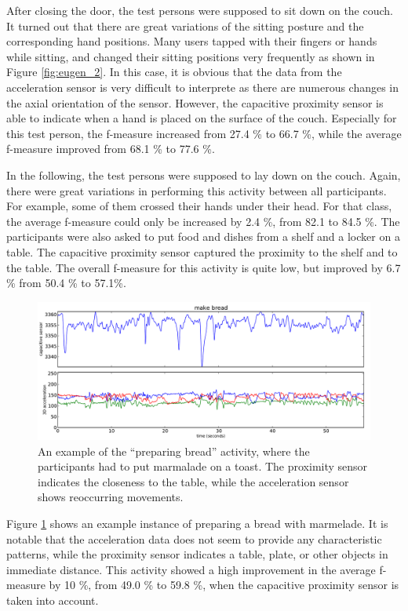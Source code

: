 \documentclass[runningheads,a4paper]{llncs}
\begin{document}
After closing the door, the test persons were supposed to sit down on the couch. It turned out that there are great variations of the sitting posture and the corresponding hand positions. Many users tapped with their fingers or hands while sitting, and changed their sitting positions very frequently as shown in Figure \ref{fig:eugen_2}. In this case, it is obvious that the data from the acceleration sensor is very difficult to interprete as there are numerous changes in the axial orientation of the sensor. However, the capacitive proximity sensor is able to indicate when a hand is placed on the surface of the couch. Especially for this test person, the f-measure increased from 27.4 \% to 66.7 \%, while the average f-measure improved from 68.1 \% to 77.6 \%. 

In the following, the test persons were supposed to lay down on the couch. Again, there were great variations in performing this activity between all participants. For example, some of them crossed their hands under their head. For that class, the average f-measure could only be increased by 2.4 \%, from 82.1 to 84.5 \%. The participants were also asked to put food and dishes from a shelf and a locker on a table. The capacitive proximity sensor captured the proximity to the shelf and to the table. The overall f-measure for this activity is quite low, but improved by 6.7 \% from 50.4 \% to 57.1\%. 

\begin{figure}
	\centering
		\includegraphics[width=\textwidth]{../Auswertung/images/eugen_5.pdf}
	\caption{An example of the ``preparing bread'' activity, where the participants had to put marmalade on a toast. The proximity sensor indicates the closeness to the table, while the acceleration sensor shows reoccurring movements.}
	\label{fig:eugen_5}
\end{figure}

Figure \ref{fig:eugen_5} shows an example instance of preparing a bread with marmelade. It is notable that the acceleration data does not seem to provide any characteristic patterns, while the proximity sensor indicates a table, plate, or other objects in immediate distance. This activity showed a high improvement in the average f-measure by 10 \%, from 49.0 \% to 59.8 \%, when the capacitive proximity sensor is taken into account. 
\end{document}
